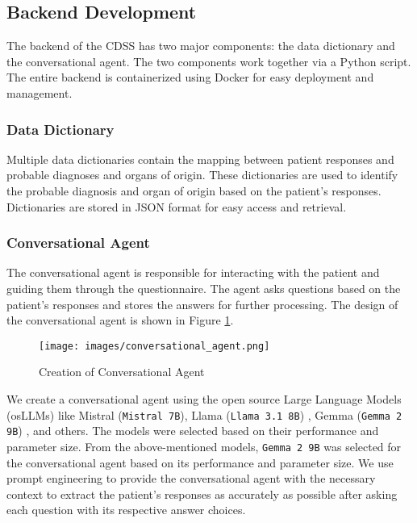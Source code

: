 \subsection{Backend Development}
The backend of the CDSS has two major components: the data dictionary and the conversational agent. The two components work together via a Python script. The entire backend is containerized using Docker for easy deployment and management.

\subsubsection{Data Dictionary}
Multiple data dictionaries contain the mapping between patient responses and probable diagnoses and organs of origin. These dictionaries are used to identify the probable diagnosis and organ of origin based on the patient's responses. Dictionaries are stored in JSON format for easy access and retrieval.
\subsubsection{Conversational Agent}
The conversational agent is responsible for interacting with the patient and guiding them through the questionnaire. The agent asks questions based on the patient's responses and stores the answers for further processing. The design of the conversational agent is shown in Figure \ref{fig:conversational_agent}.

\begin{figure}[H]
    \centering
    \texttt{[image: images/conversational\_agent.png]}
    \caption{Creation of Conversational Agent}
    \label{fig:conversational_agent}
\end{figure}

\noindent We create a conversational agent using the open source Large Language Models (osLLMs) like Mistral (\texttt{Mistral 7B})\cite{jiang2023mistral}, Llama (\texttt{Llama 3.1 8B}) \cite{dubey2024llama}, Gemma (\texttt{Gemma 2 9B}) \cite{team2024gemma}, and others. The models were selected based on their performance and parameter size. From the above-mentioned models, \texttt{Gemma 2 9B} was selected for the conversational agent based on its performance and parameter size. We use prompt engineering \cite{liu2023pre} to provide the conversational agent with the necessary context to extract the patient's responses as accurately as possible after asking each question with its respective answer choices. \\[\baselineskip]

